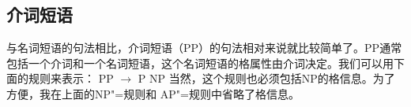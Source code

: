 \subsection{介词短语}
\label{Abschnitt-PP-Syntax}
与名词短语的句法相比，介词短语（PP）的句法相对来说就比较简单了。PP通常包括一个介词和一个名词短语，这个名词短语的格属性由介词决定。我们可以用下面的规则来表示：
\ea
\label{Regel-PP-einfach}
PP $\to$ P NP
\z
当然，这个规则也必须包括NP的格信息。为了方便，我在上面的NP"=规则和 AP"=规则中省略了格信息。

